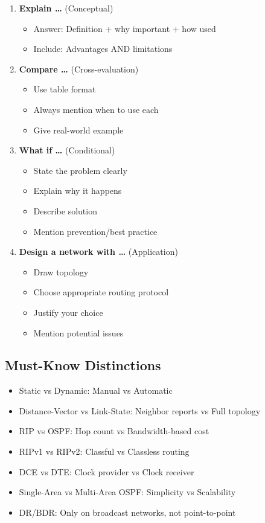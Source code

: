 \documentclass[12pt,a4paper]{article}
\begin{document}
\begin{enumerate}
    \item \textbf{Explain \ldots} (Conceptual)
    \begin{itemize}
        \item Answer: Definition + why important + how used
        \item Include: Advantages AND limitations
    \end{itemize}

    \item \textbf{Compare \ldots} (Cross-evaluation)
    \begin{itemize}
        \item Use table format
        \item Always mention when to use each
        \item Give real-world example
    \end{itemize}

    \item \textbf{What if \ldots} (Conditional)
    \begin{itemize}
        \item State the problem clearly
        \item Explain why it happens
        \item Describe solution
        \item Mention prevention/best practice
    \end{itemize}

    \item \textbf{Design a network with \ldots} (Application)
    \begin{itemize}
        \item Draw topology
        \item Choose appropriate routing protocol
        \item Justify your choice
        \item Mention potential issues
    \end{itemize}
\end{enumerate}

\subsection{Must-Know Distinctions}

\begin{itemize}
    \item Static vs Dynamic: Manual vs Automatic
    \item Distance-Vector vs Link-State: Neighbor reports vs Full topology
    \item RIP vs OSPF: Hop count vs Bandwidth-based cost
    \item RIPv1 vs RIPv2: Classful vs Classless routing
    \item DCE vs DTE: Clock provider vs Clock receiver
    \item Single-Area vs Multi-Area OSPF: Simplicity vs Scalability
    \item DR/BDR: Only on broadcast networks, not point-to-point
\end{itemize}
\end{document}
